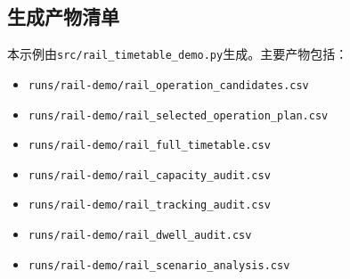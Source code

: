 \documentclass[withoutpreface]{cumcmthesis}
\begin{document}
\begin{appendices}
\section{生成产物清单}
本示例由\texttt{src/rail\_timetable\_demo.py}生成。主要产物包括：
\begin{itemize}
\item \texttt{runs/rail-demo/rail\_operation\_candidates.csv}
\item \texttt{runs/rail-demo/rail\_selected\_operation\_plan.csv}
\item \texttt{runs/rail-demo/rail\_full\_timetable.csv}
\item \texttt{runs/rail-demo/rail\_capacity\_audit.csv}
\item \texttt{runs/rail-demo/rail\_tracking\_audit.csv}
\item \texttt{runs/rail-demo/rail\_dwell\_audit.csv}
\item \texttt{runs/rail-demo/rail\_scenario\_analysis.csv}
\end{itemize}
\end{appendices}
\end{document}
